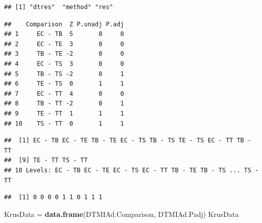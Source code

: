 \documentclass[]{article}
\newenvironment{Shaded}{\begin{snugshade}}{\end{snugshade}}
\newcommand{\DataTypeTok}[1]{\textcolor[rgb]{0.13,0.29,0.53}{#1}}
\newcommand{\DecValTok}[1]{\textcolor[rgb]{0.00,0.00,0.81}{#1}}
\newcommand{\KeywordTok}[1]{\textcolor[rgb]{0.13,0.29,0.53}{\textbf{#1}}}
\newcommand{\NormalTok}[1]{#1}
\newcommand{\OperatorTok}[1]{\textcolor[rgb]{0.81,0.36,0.00}{\textbf{#1}}}
\newcommand{\StringTok}[1]{\textcolor[rgb]{0.31,0.60,0.02}{#1}}
\begin{document}
\begin{verbatim}
## [1] "dtres"  "method" "res"
\end{verbatim}

\begin{Shaded}
\end{Shaded}

\begin{verbatim}
##    Comparison  Z P.unadj P.adj
## 1     EC - TB  5       0     0
## 2     EC - TE  3       0     0
## 3     TB - TE -2       0     0
## 4     EC - TS  3       0     0
## 5     TB - TS -2       0     1
## 6     TE - TS  0       1     1
## 7     EC - TT  4       0     0
## 8     TB - TT -2       0     1
## 9     TE - TT  1       1     1
## 10    TS - TT  0       1     1
\end{verbatim}

\begin{Shaded}
\end{Shaded}

\begin{verbatim}
##  [1] EC - TB EC - TE TB - TE EC - TS TB - TS TE - TS EC - TT TB - TT
##  [9] TE - TT TS - TT
## 10 Levels: EC - TB EC - TE EC - TS EC - TT TB - TE TB - TS ... TS - TT
\end{verbatim}

\begin{Shaded}
\end{Shaded}

\begin{verbatim}
##  [1] 0 0 0 0 1 1 0 1 1 1
\end{verbatim}

\begin{Shaded}
\begin{Highlighting}[]
\NormalTok{KrusData =}\StringTok{ }\KeywordTok{data.frame}\NormalTok{(DTMIAd.Comparison, DTMIAd.Padj)}
\NormalTok{KrusData}
\end{Highlighting}
\end{Shaded}
\end{document}

